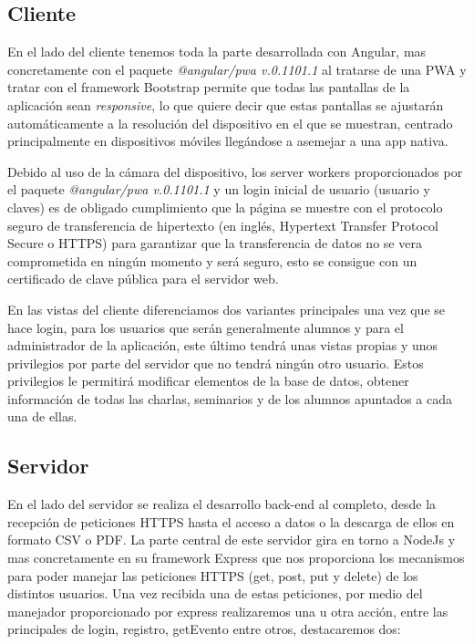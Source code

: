 \documentclass[a4paper, 12pt]{book}
\begin{document}
 
\subsection{Cliente}
	En el lado del cliente tenemos toda la parte desarrollada con Angular, mas concretamente con el paquete \textit{@angular/pwa v.0.1101.1} al tratarse de una PWA y tratar con el framework Bootstrap permite que todas las pantallas de la aplicación sean \textit{responsive}, lo que quiere decir que estas pantallas se ajustarán automáticamente a la resolución del dispositivo en el que se muestran, centrado principalmente en dispositivos móviles llegándose a asemejar a una app nativa.
	
	Debido al uso de la cámara del dispositivo, los server workers proporcionados por el paquete \textit{@angular/pwa v.0.1101.1} y un login inicial de usuario (usuario y claves) es de obligado cumplimiento que la página se muestre con el protocolo seguro de transferencia de hipertexto (en inglés, Hypertext Transfer Protocol Secure o HTTPS)  para garantizar que la transferencia de datos no se vera comprometida en ningún momento y será seguro, esto se consigue con un certificado de clave pública para el servidor web.
	
	En las vistas del cliente diferenciamos dos variantes principales una vez que se hace login, para los usuarios que serán generalmente alumnos y para el administrador de la aplicación, este último tendrá unas vistas propias y unos privilegios por parte del servidor que no tendrá ningún otro usuario. Estos privilegios le permitirá modificar elementos de la base de datos, obtener información de todas las charlas, seminarios y de los alumnos apuntados a cada una de ellas.

	
\subsection{Servidor}
	En el lado del servidor se realiza el desarrollo back-end al completo, desde la recepción de peticiones HTTPS hasta el acceso a datos o la descarga de ellos en formato CSV o PDF.
	La parte central de este servidor gira en torno a NodeJs y mas concretamente en su framework Express que nos proporciona los mecanismos para poder manejar las peticiones HTTPS (get, post, put y delete) de los distintos usuarios. Una vez recibida una de estas peticiones, por medio del manejador proporcionado por express realizaremos una u otra acción, entre las principales de login, registro, getEvento entre otros, destacaremos dos:
	
\end{document}
